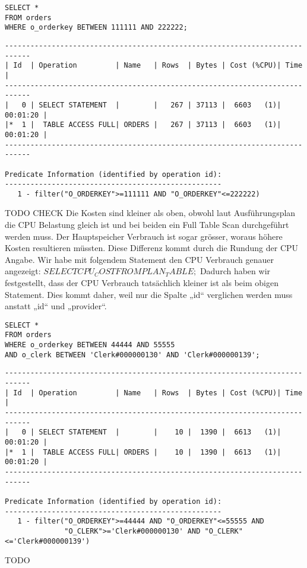 \documentclass[10pt]{article}
\begin{document}
\begin{lstlisting}[style=sql]
SELECT *
FROM orders
WHERE o_orderkey BETWEEN 111111 AND 222222;
\end{lstlisting}
\begin{lstlisting}[style=queryexecutionplan]
----------------------------------------------------------------------------
| Id  | Operation         | Name   | Rows  | Bytes | Cost (%CPU)| Time     |
----------------------------------------------------------------------------
|   0 | SELECT STATEMENT  |        |   267 | 37113 |  6603   (1)| 00:01:20 |
|*  1 |  TABLE ACCESS FULL| ORDERS |   267 | 37113 |  6603   (1)| 00:01:20 |
----------------------------------------------------------------------------

Predicate Information (identified by operation id):
---------------------------------------------------
   1 - filter("O_ORDERKEY">=111111 AND "O_ORDERKEY"<=222222)
\end{lstlisting}
TODO CHECK
Die Kosten sind kleiner als oben, obwohl laut Ausführungsplan die CPU Belastung 
gleich ist und bei beiden ein Full Table Scan durchgeführt werden muss. Der 
Hauptspeicher Verbrauch ist sogar grösser, woraus höhere Kosten resultieren 
müssten. Diese Differenz kommt durch die Rundung der CPU Angabe. Wir habe mit 
folgendem Statement den CPU Verbrauch genauer angezeigt:
$SELECT
CPU_COST
FROM
PLAN_TABLE;$
Dadurch haben wir festgestellt, dass der CPU Verbrauch tatsächlich kleiner ist 
als beim obigen Statement. Dies kommt daher, weil nur die Spalte „id“ 
verglichen werden muss anstatt „id“ und „provider“.

\begin{lstlisting}[style=sql]
SELECT *
FROM orders
WHERE o_orderkey BETWEEN 44444 AND 55555
AND o_clerk BETWEEN 'Clerk#000000130' AND 'Clerk#000000139';
\end{lstlisting}
\begin{lstlisting}[style=queryexecutionplan]
----------------------------------------------------------------------------
| Id  | Operation         | Name   | Rows  | Bytes | Cost (%CPU)| Time     |
----------------------------------------------------------------------------
|   0 | SELECT STATEMENT  |        |    10 |  1390 |  6613   (1)| 00:01:20 |
|*  1 |  TABLE ACCESS FULL| ORDERS |    10 |  1390 |  6613   (1)| 00:01:20 |
----------------------------------------------------------------------------

Predicate Information (identified by operation id):
---------------------------------------------------
   1 - filter("O_ORDERKEY">=44444 AND "O_ORDERKEY"<=55555 AND 
              "O_CLERK">='Clerk#000000130' AND "O_CLERK"<='Clerk#000000139')
\end{lstlisting}
TODO
\end{document}

